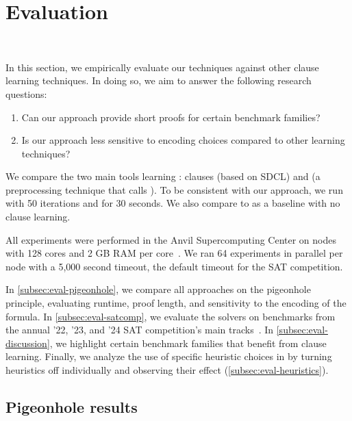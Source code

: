 \section{Evaluation}~\label{sec:evaluation}

In this section, we empirically evaluate our techniques against other \pr clause
learning techniques. In doing so, we aim to answer the following research questions:


\begin{enumerate}
    \item Can our approach provide short \pr proofs for certain benchmark families?
    \item Is our approach less sensitive to encoding choices compared to other
    \pr learning techniques?
\end{enumerate}


We compare the two main tools learning \pr: clauses \sadical (based on SDCL)
and \prelearn (a preprocessing technique that calls \sadical). To be consistent with our approach,
we run \prelearn with 50 iterations and for 30 seconds. We also compare to \cadical as a baseline with no \pr clause learning.

All experiments were performed in the Anvil Supercomputing Center on nodes with
128 cores and 2 GB RAM per core~\cite{anvil}. We ran 64 experiments in parallel per node
with a 5,000 second timeout, the default timeout for the SAT competition.

In \autoref{subsec:eval-pigeonhole}, we compare all approaches
on the pigeonhole principle, evaluating runtime, proof length, and sensitivity to the encoding of the formula. 
In \autoref{subsec:eval-satcomp}, we evaluate the solvers on benchmarks from the
annual '22, '23, and '24 SAT competition's main 
tracks~\cite{satcomp2022,satcomp2023,satcomp2024}. 
In \autoref{subsec:eval-discussion}, we highlight certain benchmark families
that benefit from \pr clause learning. %
Finally, we analyze the use of specific heuristic choices in \tool
by turning heuristics off individually and observing their effect (\autoref{subsec:eval-heuristics}). 



\subsection{Pigeonhole results}~\label{subsec:eval-pigeonhole}


